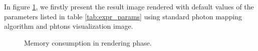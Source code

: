 In figure \ref{fig:pm_global}, we firstly present the result image rendered with default values of the parameters listed in table \ref{tab:expr_params} using standard photon mapping algorithm and phtons visualization image. 

\begin{figure}[htp] 
    \centering 
    \renewcommand{\thefigure}{\thechapter.\arabic{figure}}
    \caption[]{Memory consumption in rendering phase.}
    \label{fig:pm_global} 
\end{figure}   

